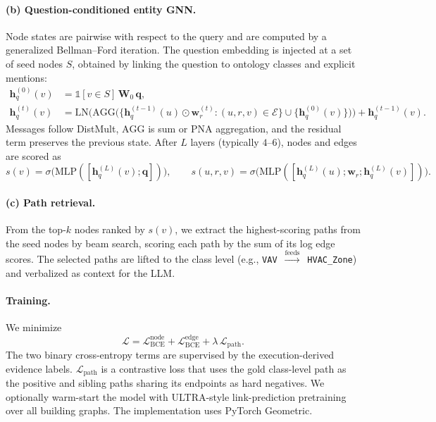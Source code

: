 \documentclass[11pt]{article}
\newcommand{\code}[1]{\texttt{#1}}
\begin{document}
\paragraph{(b) Question-conditioned entity GNN.}
Node states are pairwise with respect to the query and are computed by a generalized Bellman--Ford iteration. The question embedding is injected at a set of seed nodes $S$, obtained by linking the question to ontology classes and explicit mentions:
\begin{align}
  \mathbf{h}^{(0)}_q(v) &= \mathbb{1}[v\in S]\, \mathbf{W}_0\, \mathbf{q}, \label{eq:boundary}\\
  \mathbf{h}^{(t)}_q(v) &= \mathrm{LN}\Big(\mathrm{AGG}\big(\{\mathbf{h}^{(t-1)}_q(u)\odot\mathbf{w}^{(t)}_r : (u,r,v)\in\mathcal{E}\}\cup\{\mathbf{h}^{(0)}_q(v)\}\big)\Big) + \mathbf{h}^{(t-1)}_q(v). \label{eq:bf}
\end{align}
Messages follow DistMult, $\mathrm{AGG}$ is sum or PNA aggregation, and the residual term preserves the previous state. After $L$ layers (typically $4$--$6$), nodes and edges are scored as
\begin{equation}
  s(v)=\sigma\big(\mathrm{MLP}([\mathbf{h}^{(L)}_q(v);\mathbf{q}])\big),\qquad
  s(u,r,v)=\sigma\big(\mathrm{MLP}([\mathbf{h}^{(L)}_q(u);\mathbf{w}_r;\mathbf{h}^{(L)}_q(v)])\big).
\end{equation}

\paragraph{(c) Path retrieval.}
From the top-$k$ nodes ranked by $s(v)$, we extract the highest-scoring paths from the seed nodes by beam search, scoring each path by the sum of its log edge scores. The selected paths are lifted to the class level (e.g., \code{VAV}~$\xrightarrow{\text{feeds}}$~\code{HVAC\_Zone}) and verbalized as context for the LLM.

\paragraph{Training.}
We minimize
\begin{equation}
  \mathcal{L}=\mathcal{L}^{\text{node}}_{\text{BCE}}+\mathcal{L}^{\text{edge}}_{\text{BCE}}+\lambda\,\mathcal{L}_{\text{path}}.
\end{equation}
The two binary cross-entropy terms are supervised by the execution-derived evidence labels. $\mathcal{L}_{\text{path}}$ is a contrastive loss that uses the gold class-level path as the positive and sibling paths sharing its endpoints as hard negatives. We optionally warm-start the model with ULTRA-style link-prediction pretraining over all building graphs. The implementation uses PyTorch Geometric.
\end{document}
